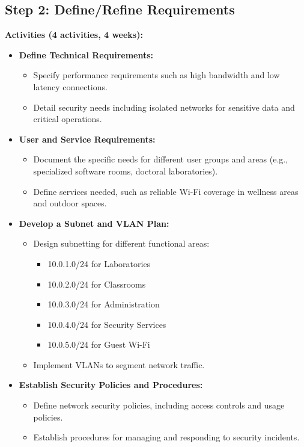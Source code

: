 \documentclass[12pt]{article}
\begin{document}
\subsection{Step 2: Define/Refine Requirements}

\textbf{Activities (4 activities, 4 weeks):}

\begin{itemize}
    \item \textbf{Define Technical Requirements:}
        \begin{itemize}
            \item Specify performance requirements such as high bandwidth and low latency connections.
            \item Detail security needs including isolated networks for sensitive data and critical operations.
        \end{itemize}
    \item \textbf{User and Service Requirements:}
        \begin{itemize}
            \item Document the specific needs for different user groups and areas (e.g., specialized software rooms, doctoral laboratories).
            \item Define services needed, such as reliable Wi-Fi coverage in wellness areas and outdoor spaces.
        \end{itemize}
    \item \textbf{Develop a Subnet and VLAN Plan:}
        \begin{itemize}
            \item Design subnetting for different functional areas:
                \begin{itemize}
                    \item 10.0.1.0/24 for Laboratories
                    \item 10.0.2.0/24 for Classrooms
                    \item 10.0.3.0/24 for Administration
                    \item 10.0.4.0/24 for Security Services
                    \item 10.0.5.0/24 for Guest Wi-Fi
                \end{itemize}
            \item Implement VLANs to segment network traffic.
        \end{itemize}
    \item \textbf{Establish Security Policies and Procedures:}
        \begin{itemize}
            \item Define network security policies, including access controls and usage policies.
            \item Establish procedures for managing and responding to security incidents.
        \end{itemize}
\end{itemize}
\end{document}
